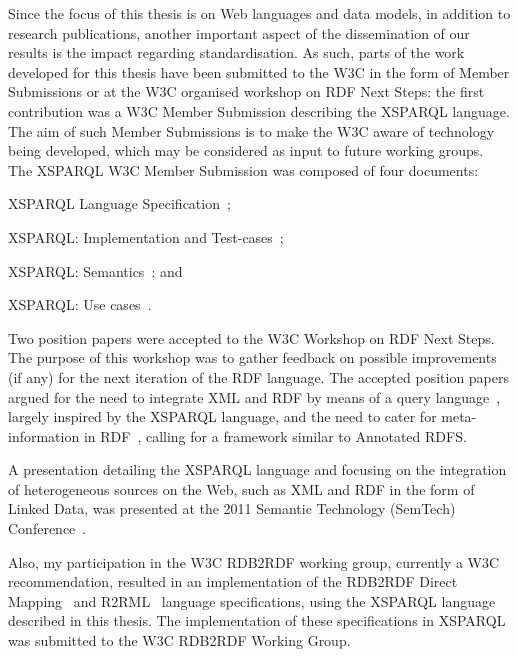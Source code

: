 Since the focus of this thesis is on Web languages and data models, in addition to research publications, another
important aspect of the dissemination of our results is the impact regarding standardisation.
%
As such, parts of the work developed for this thesis have been submitted to the \ac{W3C} in the form of Member
Submissions or at the \ac{W3C} organised workshop on RDF Next Steps:
%
the first contribution was a \ac{W3C} Member Submission describing the XSPARQL language.  The aim of such Member
Submissions is to make the \ac{W3C} aware of technology being developed, which may be considered as input to future
working groups.
%
The XSPARQL \ac{W3C} Member Submission was composed of four documents:
\begin{inparaenum}[(i)]
\item XSPARQL Language Specification~\cite{PolleresKrennwallnerLopes:2009aa};
\item XSPARQL: Implementation and Test-cases~\cite{LopesKrennwallnerPolleres:2009aa};
\item XSPARQL: Semantics~\cite{KrennwallnerLopesPolleres:2009aa}; and
\item XSPARQL: Use cases~\cite{PassantKopeckyCorlosquet:2009aa}. 
\end{inparaenum}
%

Two position papers were accepted to the \ac{W3C} Workshop on RDF Next Steps. The purpose of this workshop was to gather
feedback on possible improvements (if any) for the next iteration of the \ac{RDF} language.  The accepted position
papers argued for the need to integrate \ac{XML} and \ac{RDF} by means of a query
language~\cite{LopesBischofErling:2010aa}, largely inspired by the XSPARQL language, and the need to cater for
meta-information in \ac{RDF}~\cite{LopesZimmermannHogan:2010aa}, calling for a framework similar to Annotated RDFS.

A presentation detailing the XSPARQL language and focusing on the integration of heterogeneous sources on the Web, such
as \ac{XML} and \ac{RDF} in the form of Linked Data, was presented at the 2011 Semantic Technology (SemTech)
Conference~\cite{LopesPolleres:2011aa}.  


Also, my participation in the \ac{W3C} RDB2RDF working group, currently a \ac{W3C} recommendation, resulted in an
implementation of the RDB2RDF Direct Mapping~\cite{ArenasPrudhommeauxSequeda:2011aa} and
R2RML~\cite{DasSundaraCyganiak:2011aa} language specifications, using the XSPARQL language described in this thesis.
The implementation of these specifications in XSPARQL was submitted to the \ac{W3C} RDB2RDF Working Group.




